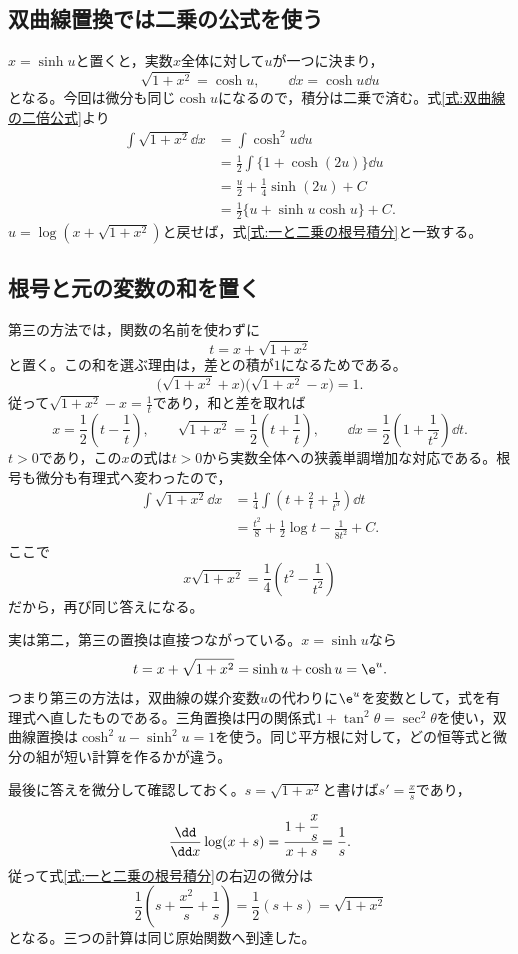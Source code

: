\subsection{双曲線置換では二乗の公式を使う}

$x=\sinh u$と置くと，実数$x$全体に対して$u$が一つに決まり，
\[
\sqrt{1+x^2}=\cosh u,\qquad
\dd x=\cosh u\dd u
\]
となる。今回は微分も同じ$\cosh u$になるので，積分は二乗で済む。式\eqref{式:双曲線の二倍公式}より
\[
\begin{aligned}
\int\sqrt{1+x^2}\dd x
&=\int\cosh^2u\dd u\\
&=\frac12\int\{1+\cosh(2u)\}\dd u\\
&=\frac u2+\frac14\sinh(2u)+C\\
&=\frac12\{u+\sinh u\cosh u\}+C.
\end{aligned}
\]
$u=\log(x+\sqrt{1+x^2})$と戻せば，式\eqref{式:一と二乗の根号積分}と一致する。

\subsection{根号と元の変数の和を置く}

第三の方法では，関数の名前を使わずに
\[
t=x+\sqrt{1+x^2}
\]
と置く。この和を選ぶ理由は，差との積が$1$になるためである。
\[
\bigl(\sqrt{1+x^2}+x\bigr)
\bigl(\sqrt{1+x^2}-x\bigr)=1.
\]
従って$\sqrt{1+x^2}-x=\frac1t$であり，和と差を取れば
\[
x=\frac12\left(t-\frac1t\right),\qquad
\sqrt{1+x^2}=\frac12\left(t+\frac1t\right),\qquad
\dd x=\frac12\left(1+\frac1{t^2}\right)\dd t.
\]
$t>0$であり，この$x$の式は$t>0$から実数全体への狭義単調増加な対応である。根号も微分も有理式へ変わったので，
\[
\begin{aligned}
\int\sqrt{1+x^2}\dd x
&=\frac14\int\left(t+\frac2t+\frac1{t^3}\right)\dd t\\
&=\frac{t^2}{8}+\frac12\log t-\frac1{8t^2}+C.
\end{aligned}
\]
ここで
\[
x\sqrt{1+x^2}=\frac14\left(t^2-\frac1{t^2}\right)
\]
だから，再び同じ答えになる。

実は第二，第三の置換は直接つながっている。$x=\sinh u$なら
\[
t=x+\sqrt{1+x^2}=\sinh u+\cosh u=\e^u.
\]
つまり第三の方法は，双曲線の媒介変数$u$の代わりに$\e^u$を変数として，式を有理式へ直したものである。三角置換は円の関係式$1+\tan^2\theta=\sec^2\theta$を使い，双曲線置換は$\cosh^2u-\sinh^2u=1$を使う。同じ平方根に対して，どの恒等式と微分の組が短い計算を作るかが違う。

最後に答えを微分して確認しておく。$s=\sqrt{1+x^2}$と書けば$s'=\frac xs$であり，
\[
\frac{\dd}{\dd x}\log(x+s)
=\cfrac{1+\cfrac xs}{x+s}=\frac1s.
\]
従って式\eqref{式:一と二乗の根号積分}の右辺の微分は
\[
\frac12\left(s+\frac{x^2}{s}+\frac1s\right)
=\frac12(s+s)=\sqrt{1+x^2}
\]
となる。三つの計算は同じ原始関数へ到達した。

